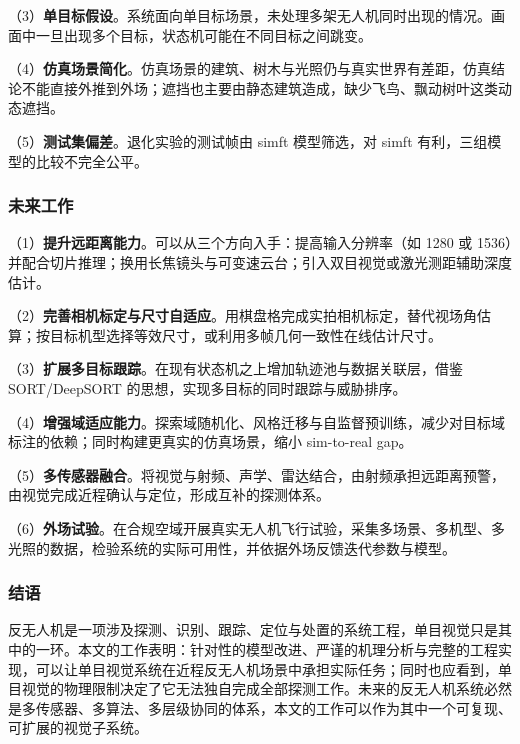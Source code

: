 （3）\textbf{单目标假设}。系统面向单目标场景，未处理多架无人机同时出现的情况。画面中一旦出现多个目标，状态机可能在不同目标之间跳变。

（4）\textbf{仿真场景简化}。仿真场景的建筑、树木与光照仍与真实世界有差距，仿真结论不能直接外推到外场；遮挡也主要由静态建筑造成，缺少飞鸟、飘动树叶这类动态遮挡。

（5）\textbf{测试集偏差}。退化实验的测试帧由 simft 模型筛选，对 simft 有利，三组模型的比较不完全公平。

\subsubsection{未来工作}

（1）\textbf{提升远距离能力}。可以从三个方向入手：提高输入分辨率（如 1280 或 1536）并配合切片推理；换用长焦镜头与可变速云台；引入双目视觉或激光测距辅助深度估计。

（2）\textbf{完善相机标定与尺寸自适应}。用棋盘格完成实拍相机标定，替代视场角估算；按目标机型选择等效尺寸，或利用多帧几何一致性在线估计尺寸。

（3）\textbf{扩展多目标跟踪}。在现有状态机之上增加轨迹池与数据关联层，借鉴 SORT/DeepSORT 的思想，实现多目标的同时跟踪与威胁排序。

（4）\textbf{增强域适应能力}。探索域随机化、风格迁移与自监督预训练，减少对目标域标注的依赖；同时构建更真实的仿真场景，缩小 sim-to-real gap。

（5）\textbf{多传感器融合}。将视觉与射频、声学、雷达结合，由射频承担远距离预警，由视觉完成近程确认与定位，形成互补的探测体系。

（6）\textbf{外场试验}。在合规空域开展真实无人机飞行试验，采集多场景、多机型、多光照的数据，检验系统的实际可用性，并依据外场反馈迭代参数与模型。

\subsubsection{结语}

反无人机是一项涉及探测、识别、跟踪、定位与处置的系统工程，单目视觉只是其中的一环。本文的工作表明：针对性的模型改进、严谨的机理分析与完整的工程实现，可以让单目视觉系统在近程反无人机场景中承担实际任务；同时也应看到，单目视觉的物理限制决定了它无法独自完成全部探测工作。未来的反无人机系统必然是多传感器、多算法、多层级协同的体系，本文的工作可以作为其中一个可复现、可扩展的视觉子系统。

